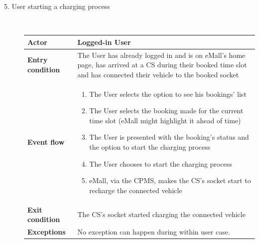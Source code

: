 \documentclass[11pt]{article}
\begin{document}
\begin{description}
    \item [5. User starting a charging process] \hfill \\
    \begin{table}[H]
        \centering
        \setlength{\tabcolsep}{18pt}
        \renewcommand{\arraystretch}{1.4}
        \begin{tabularx}{\textwidth}{|>{\hsize=0.5\hsize}X|>{\hsize=1.5\hsize}X|}
            \hline
            \textbf{Actor} & Logged-in User \\
            \hline
            \textbf{Entry condition} & The User has already logged in and is on eMall's home page, has arrived at a CS during their booked time slot and has connected their vehicle to the booked socket \\
            \hline
            \textbf{Event flow} & 
                \begin{minipage}[t]{\hsize}
                \begin{enumerate}[topsep=0pt, leftmargin=*]
                    \item The User selects the option to see his bookings' list
                    \item The User selects the booking made for the current time slot (eMall might highlight it ahead of time)
                    \item The User is presented with the booking's status and the option to start the charging process
                    \item The User chooses to start the charging process
                    \item eMall, via the CPMS, makes the CS's socket start to recharge the connected vehicle
                \end{enumerate}
                \end{minipage}
                \vspace{6pt}
            \\
            \hline
            \textbf{Exit condition} & The CS's socket started charging the connected vehicle \\
            \hline
            \textbf{Exceptions} & No exception can happen during within user case. \\
            \hline
        \end{tabularx}
    \end{table}
    

\end{description}
\end{document}
